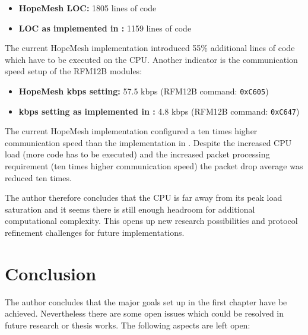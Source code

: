 \begin{itemize}
    \item \textbf{HopeMesh LOC:} 1805 lines of code
    \item \textbf{LOC as implemented in \cite{korniowski}:} 1159 lines of code
\end{itemize}

The current HopeMesh implementation introduced 55\% additional lines of code which have to be executed on the CPU. Another indicator is the communication speed setup of the RFM12B modules:

\begin{itemize}
    \item \textbf{HopeMesh kbps setting:} 57.5 kbps (RFM12B command: \texttt{0xC605})
    \item \textbf{kbps setting as implemented in \cite{korniowski}:} 4.8 kbps (RFM12B command: \texttt{0xC647})
\end{itemize}

The current HopeMesh implementation configured a ten times higher communication speed than the implementation in \cite{korniowski}. Despite the increased CPU load (more code has to be executed) and the increased packet processing requirement (ten times higher communication speed) the packet drop average was reduced ten times.

The author therefore concludes that the CPU is far away from its peak load saturation and it seems there is still enough headroom for additional computational complexity. This opens up new research possibilities and protocol refinement challenges for future implementations.

\chapter{Conclusion}%
The author concludes that the major goals set up in the first chapter have be achieved. Nevertheless there are some open issues which could be resolved in future research or thesis works. The following aspects are left open:

